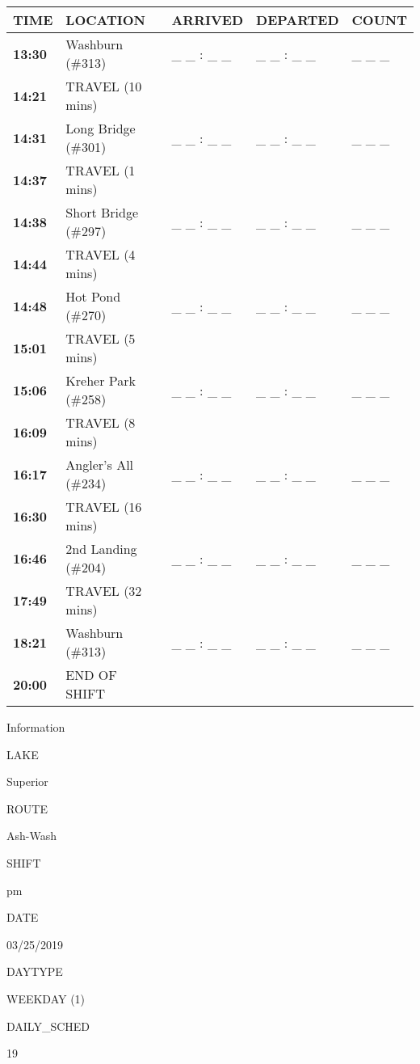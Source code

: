\documentclass[]{article}
\begin{document}
\begin{tabular}{>{\bfseries}lllll}
\toprule
\textbf{TIME} & \textbf{LOCATION} & \textbf{ARRIVED} & \textbf{DEPARTED} & \textbf{COUNT}\\
\midrule
13:30 & Washburn (\#313) & \_ \_ : \_ \_ & \_ \_ : \_ \_ & \_ \_ \_\\
14:21 & TRAVEL (10 mins) &  &  & \\
14:31 & Long Bridge (\#301) & \_ \_ : \_ \_ & \_ \_ : \_ \_ & \_ \_ \_\\
14:37 & TRAVEL (1 mins) &  &  & \\
14:38 & Short Bridge (\#297) & \_ \_ : \_ \_ & \_ \_ : \_ \_ & \_ \_ \_\\
14:44 & TRAVEL (4 mins) &  &  & \\
14:48 & Hot Pond (\#270) & \_ \_ : \_ \_ & \_ \_ : \_ \_ & \_ \_ \_\\
15:01 & TRAVEL (5 mins) &  &  & \\
15:06 & Kreher Park (\#258) & \_ \_ : \_ \_ & \_ \_ : \_ \_ & \_ \_ \_\\
16:09 & TRAVEL (8 mins) &  &  & \\
16:17 & Angler's All (\#234) & \_ \_ : \_ \_ & \_ \_ : \_ \_ & \_ \_ \_\\
16:30 & TRAVEL (16 mins) &  &  & \\
16:46 & 2nd Landing (\#204) & \_ \_ : \_ \_ & \_ \_ : \_ \_ & \_ \_ \_\\
17:49 & TRAVEL (32 mins) &  &  & \\
18:21 & Washburn (\#313) & \_ \_ : \_ \_ & \_ \_ : \_ \_ & \_ \_ \_\\
20:00 & END OF SHIFT &  &  & \\
\bottomrule
\end{tabular}\newpage

Information

LAKE

Superior

ROUTE

Ash-Wash

SHIFT

pm

DATE

03/25/2019

DAYTYPE

WEEKDAY (1)

DAILY\_SCHED

19

\vspace{24pt}
\end{document}
